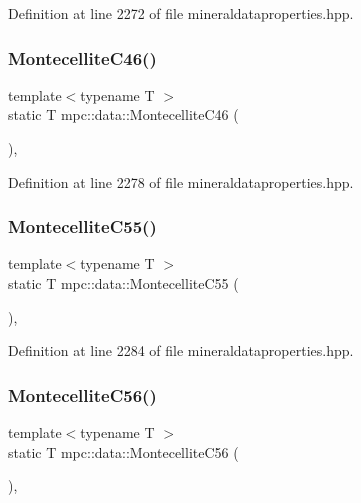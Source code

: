 Definition at line 2272 of file mineraldataproperties.\+hpp.

\mbox{\label{namespacempc_1_1data_a2e904d2b4b94d2121089c18c3ae7a3fb}} 
\subsubsection{\texorpdfstring{Montecellite\+C46()}{MontecelliteC46()}}
{\footnotesize\ttfamily template$<$typename T $>$ \\
static T mpc\+::data\+::\+Montecellite\+C46 (\begin{DoxyParamCaption}{ }\end{DoxyParamCaption})\hspace{0.3cm}{\ttfamily [inline]}, {\ttfamily [static]}}



Definition at line 2278 of file mineraldataproperties.\+hpp.

\mbox{\label{namespacempc_1_1data_af0f1890fcfed749102014397f2166c92}} 
\subsubsection{\texorpdfstring{Montecellite\+C55()}{MontecelliteC55()}}
{\footnotesize\ttfamily template$<$typename T $>$ \\
static T mpc\+::data\+::\+Montecellite\+C55 (\begin{DoxyParamCaption}{ }\end{DoxyParamCaption})\hspace{0.3cm}{\ttfamily [inline]}, {\ttfamily [static]}}



Definition at line 2284 of file mineraldataproperties.\+hpp.

\mbox{\label{namespacempc_1_1data_a966593f69ce157389a1f8523b730f7f0}} 
\subsubsection{\texorpdfstring{Montecellite\+C56()}{MontecelliteC56()}}
{\footnotesize\ttfamily template$<$typename T $>$ \\
static T mpc\+::data\+::\+Montecellite\+C56 (\begin{DoxyParamCaption}{ }\end{DoxyParamCaption})\hspace{0.3cm}{\ttfamily [inline]}, {\ttfamily [static]}}



